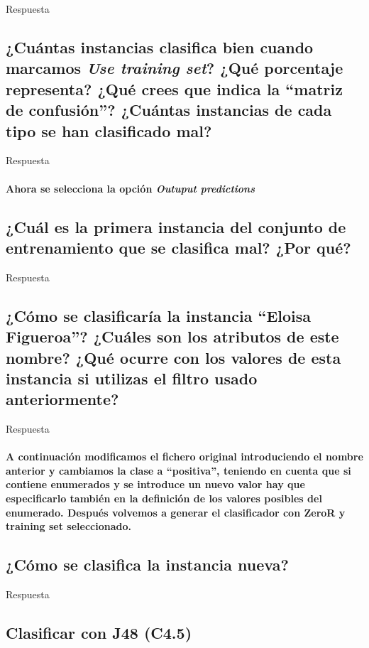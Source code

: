 \documentclass[12pt]{article}
\begin{document}
Respuesta

\subsection{\small ¿Cuántas instancias clasifica bien cuando marcamos \emph{Use
training set}? ¿Qué porcentaje representa? ¿Qué crees que indica la ``matriz de
confusión''? ¿Cuántas instancias de cada tipo se han clasificado mal?}

Respuesta

\paragraph{\small Ahora se selecciona la opción \emph{Outuput predictions}}
\subsection{\small ¿Cuál es la primera instancia del conjunto de entrenamiento que se
clasifica mal? ¿Por qué?}

Respuesta

\subsection{\small ¿Cómo se clasificarí­a la instancia ``Eloisa Figueroa''? ¿Cuáles son
los atributos de este nombre? ¿Qué ocurre con los valores de esta instancia
si utilizas el filtro usado anteriormente?}

Respuesta

\paragraph{\small A continuación modificamos el fichero original introduciendo el nombre
anterior y cambiamos la clase a ``positiva'', teniendo en cuenta que si contiene
enumerados y se introduce un nuevo valor hay que especificarlo también en la
definición de los valores posibles del enumerado. Después volvemos a generar el
clasificador con ZeroR y training set seleccionado.}
\subsection{\small ¿Cómo se clasifica la instancia nueva?}

Respuesta

\newpage

\begin{center}
\section{Clasificar con J48 (C4.5)}
\end{center}
\end{document}
